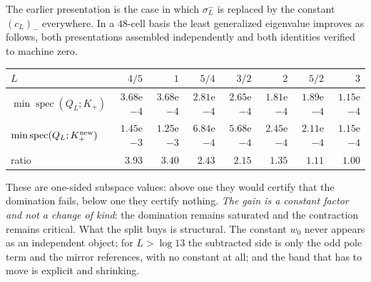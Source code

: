 The earlier presentation is the case in which $\sigma_L^-$ is replaced by the
constant $(c_L)_-$ everywhere. In a $48$-cell basis the least generalized
eigenvalue improves as follows, both presentations assembled independently and
both identities verified to machine zero.
\begin{center}
\small
\begin{tabular}{lrrrrrrr}
\toprule
$L$ & $4/5$ & $1$ & $5/4$ & $3/2$ & $2$ & $5/2$ & $3$\\
\midrule
$\min\operatorname{spec}(Q_L;K_+)$
 & $3.68$e$-4$ & $3.68$e$-4$ & $2.81$e$-4$ & $2.65$e$-4$ & $1.81$e$-4$ & $1.89$e$-4$ & $1.15$e$-4$\\
$\min\operatorname{spec}(Q_L;K_+^{\rm new})$
 & $1.45$e$-3$ & $1.25$e$-3$ & $6.84$e$-4$ & $5.68$e$-4$ & $2.45$e$-4$ & $2.11$e$-4$ & $1.15$e$-4$\\
ratio & $3.93$ & $3.40$ & $2.43$ & $2.15$ & $1.35$ & $1.11$ & $1.00$\\
\bottomrule
\end{tabular}
\end{center}

These are one-sided subspace values: above one they would certify that the
domination fails, below one they certify nothing. \emph{The gain is a constant
factor and not a change of kind}: the domination remains saturated and the
contraction remains critical. What the split buys is structural. The constant
$w_0$ never appears as an independent object; for $L>\log13$ the subtracted side
is only the odd pole term and the mirror references, with no constant at all;
and the band that has to move is explicit and shrinking.
